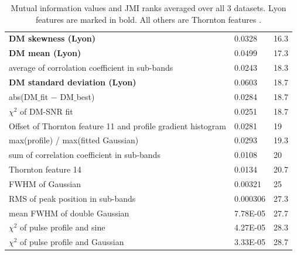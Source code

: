 \documentclass[12pt]{article}
\begin{document}
\begin{table}[]
{\begin{tabular}{|l|l|l|}
\textbf{DM skewness (Lyon)}                                  & 0.0328              & 16.3          \\
\textbf{DM mean (Lyon)}                                      & 0.0499            & 17.3 \\
average of corrolation coefficient in sub-bands     & 0.0243              & 18.3          \\
\textbf{DM standard deviation (Lyon)}                        & 0.0603            & 18.7          \\
abs(DM$\_${fit} $-$ DM$\_$best)                     & 0.0284            & 18.7          \\
$\chi ^{2}$ of DM-SNR fit                           & 0.0251              & 18.7          \\
Offset of Thornton feature 11 and profile gradient histogram & 0.0281            & 19                     \\
max(profile) / max(fitted Gaussian)                 & 0.0293              & 19.3          \\
sum of correlation coefficient in sub-bands         & 0.0108             & 20                        \\
Thornton feature 14                                 & 0.0134             & 20.7          \\
FWHM of Gaussian                                    & 0.00321            & 25                        \\
RMS of peak position in sub-bands                   & 0.000306           & 27.3          \\
mean FWHM of double Gaussian                        & 7.78E-05         & 27.7          \\
$\chi ^{2}$ of pulse profile and sine               & 4.27E-05         & 28.3          \\
$\chi ^{2}$ of pulse profile and Gaussian           & 3.33E-05         & 28.7         \\\hline
\end{tabular}
}
\caption{Mutual information values and JMI ranks averaged over all 3 datasets. Lyon features \cite{lyon2016fifty} are marked in bold. All others are Thornton features \cite{thornton2013high}.}
\label{avgJMI}
\end{table}
\end{document}
